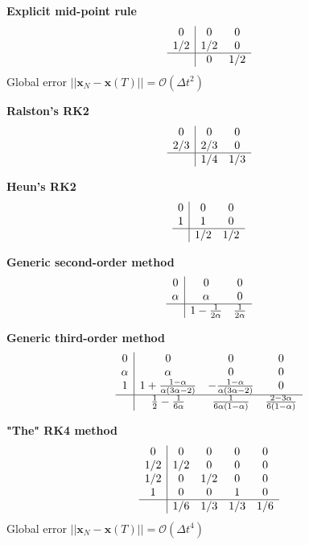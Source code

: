 \textbf{Explicit mid-point rule}
\begin{align*}
\begin{array}{c|cc}
    0 & 0 & 0 \\
    1/2 & 1/2 & 0 \\ \hline
     & 0 & 1/2
\end{array}
\end{align*}
Global error \(||\bm{x}_N-\bm{x}(T)|| = \mathcal{O}(\Delta t^2)\)
\newline

\textbf{Ralston's RK2}
\begin{align*}
\begin{array}{c|cc}
    0 & 0 & 0 \\
    2/3 & 2/3 & 0 \\ \hline
     & 1/4 & 1/3
\end{array}
\end{align*}

\textbf{Heun's RK2}
\begin{align*}
\begin{array}{c|cc}
    0 & 0 & 0 \\
    1 & 1 & 0 \\ \hline
     & 1/2 & 1/2
\end{array}
\end{align*}

\textbf{Generic second-order method}
\begin{align*}
\begin{array}{c|cc}
    0 & 0 & 0 \\
    \alpha & \alpha & 0 \\ \hline
     & 1-\frac{1}{2\alpha} & \frac{1}{2\alpha}
\end{array}
\end{align*}

\textbf{Generic third-order method}
\begin{align*}
\begin{array}{c|ccc}
    0 & 0 & 0 & 0\\
    \alpha & \alpha & 0 & 0\\
    1 & 1+\frac{1-\alpha}{\alpha(3\alpha-2)} & -\frac{1-\alpha}{\alpha(3\alpha-2)} & 0 \\ \hline
     & \frac{1}{2}-\frac{1}{6\alpha} & \frac{1}{6\alpha(1-\alpha)} & \frac{2-3\alpha}{6(1-\alpha)} 
\end{array}
\end{align*}


\textbf{"The" RK4 method}
\begin{align*}
\begin{array}{c|cccc}
    0 & 0 & 0 & 0 & 0\\
    1/2 & 1/2 & 0 & 0 & 0\\
    1/2 & 0 & 1/2 & 0 & 0\\
    1 & 0 & 0 & 1 & 0 \\ \hline
     & 1/6 & 1/3 & 1/3 & 1/6
\end{array}
\end{align*}
Global error \(||\bm{x}_N-\bm{x}(T)|| = \mathcal{O}(\Delta t^4)\)
\newline

